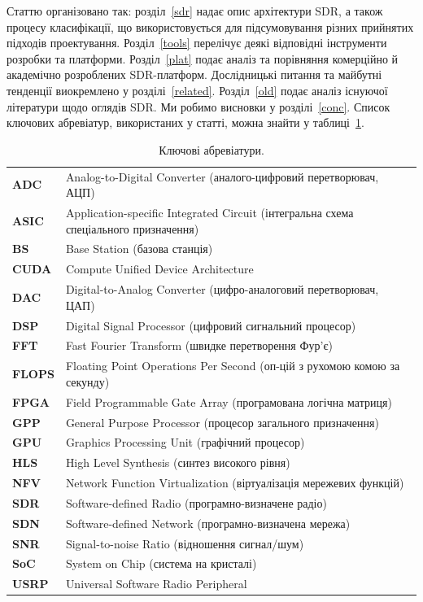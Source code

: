 \documentclass[journal]{IEEEtran}
\begin{document}
Статтю організовано так: розділ~\ref{sdr} надає опис архітектури SDR, а також процесу класифікації, що використовується для підсумовування різних прийнятих підходів проектування.
Розділ~\ref{tools} перелічує деякі відповідні інструменти розробки та платформи.
Розділ~\ref{plat} подає аналіз та порівняння комерційно й академічно розроблених SDR-платформ.
Дослідницькі питання та майбутні тенденції виокремлено у розділі~\ref{related}.
Розділ~\ref{old} подає аналіз існуючої літератури щодо оглядів SDR.
Ми робимо висновки у розділі~\ref{conc}.
Список ключових абревіатур, використаних у статті, можна знайти у таблиці~\ref{acro}.


\begin{table}[]
\centering
\caption{Ключові абревіатури.}
\label{acro}
\begin{tabular}{ll}
\hline
\textbf{ADC}   & Analog-to-Digital Converter (аналого-цифровий перетворювач, АЦП) \\
\textbf{ASIC}  & Application-specific Integrated Circuit (інтегральна схема спеціального призначення) \\
\textbf{BS}    & Base Station (базова станція) \\
\textbf{CUDA}  & Compute Unified Device Architecture \\
\textbf{DAC}   & Digital-to-Analog Converter (цифро-аналоговий перетворювач, ЦАП) \\
\textbf{DSP}   & Digital Signal Processor (цифровий сигнальний процесор) \\
\textbf{FFT}   & Fast Fourier Transform (швидке перетворення Фур'є) \\
\textbf{FLOPS} & Floating Point Operations Per Second (оп-цій з рухомою комою за секунду) \\
\textbf{FPGA}  & Field Programmable Gate Array (програмована логічна матриця) \\
\textbf{GPP}   & General Purpose Processor (процесор загального призначення) \\
\textbf{GPU}   & Graphics Processing Unit (графічний процесор) \\
\textbf{HLS}   & High Level Synthesis (синтез високого рівня) \\
\textbf{NFV}   & Network Function Virtualization (віртуалізація мережевих функцій) \\
\textbf{SDR}   & Software-defined Radio (програмно-визначене радіо) \\
\textbf{SDN}   & Software-defined Network (програмно-визначена мережа) \\
\textbf{SNR}   & Signal-to-noise Ratio (відношення сигнал/шум) \\
\textbf{SoC}   & System on Chip (система на кристалі) \\
\textbf{USRP}  & Universal Software Radio Peripheral \\\hline
\end{tabular}
\end{table}
\end{document}
